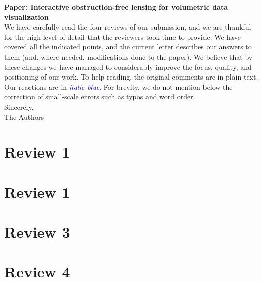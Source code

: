 \documentclass[a4paper,10pt]{article}
\newcommand{\rr}[1]{\emph{\textcolor{Blue}{#1}}}
\begin{document}
\noindent\textbf{Paper: Interactive obstruction-free lensing for volumetric data visualization}\\

We have carefully read the four reviews of our submission, and we are thankful for the high level-of-detail that the reviewers took time to provide. We have covered all the
indicated points, and the current letter describes our answers to them (and, where needed, modifications done to the paper). We believe that by these changes we have managed to considerably improve the focus, quality, and positioning
of our work. To help reading, the original comments are in plain text. Our reactions are in \rr{italic blue}. For brevity, we do not mention below the correction of small-scale errors such as typos and word order.\\

\noindent Sincerely,\\
The Authors\\


\section{Review 1}


\section{Review 1}

\section{Review 3}

\section{Review 4}
\end{document}
